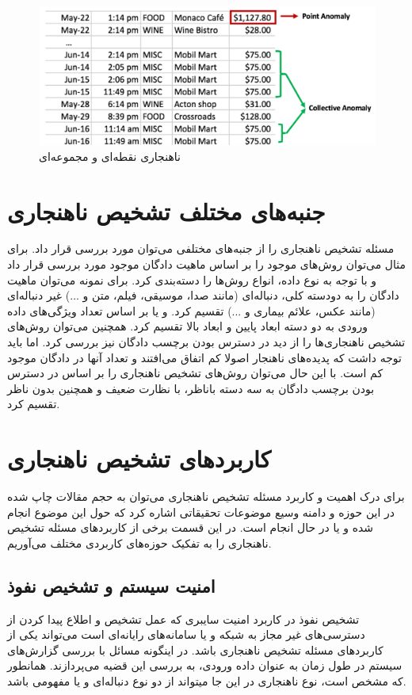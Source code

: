 \documentclass[12pt,a4paper]{report}
\begin{document}
\begin{figure}[!hp]
	\begin{center}
		\includegraphics[width=0.7\linewidth]{./images/figures/credit-card.png}

		\caption{
		ناهنجاری نقطه‌ای و مجموعه‌ای
		\cite{G.Chalapathy}
		}		
		\label{fig:anomaly-example-1}
		\centering
	\end{center}
\end{figure}

\section{جنبه‌های مختلف تشخیص ناهنجاری}
مسئله تشخیص ناهنجاری را از جنبه‌های مختلفی می‌توان مورد بررسی قرار داد. برای مثال می‌توان روش‌های موجود را بر اساس ماهیت دادگان موجود مورد بررسی قرار داد و با توجه به نوع داده، انواع روش‌ها را دسته‌بندی کرد. برای نمونه می‌توان ماهیت دادگان را به دودسته کلی، دنباله‌ای (مانند صدا، موسیقی، فیلم، متن و ...) غیر دنباله‌ای (مانند عکس، علائم بیماری و ...) تقسیم کرد. و یا بر اساس تعداد ویژگی‌های داده ورودی به دو دسته ابعاد پایین و ابعاد بالا تقسیم کرد. همچنین می‌توان روش‌های تشخیص ناهنجاری‌ها را از دید در دسترس بودن برچسب دادگان نیز بررسی کرد. اما باید توجه داشت که پدیده‌های ناهنجار اصولا کم اتفاق می‌افتند و تعداد آنها در دادگان موجود کم است. با این حال می‌توان روش‌های تشخیص ناهنجاری را بر اساس در دسترس بودن برچسب دادگان به سه دسته باناظر، با نظارت ضعیف و همچنین بدون ناظر تقسیم کرد.

\section {کاربرد‌های تشخیص ناهنجاری}
برای درک اهمیت و کاربرد مسئله تشخیص ناهنجاری می‌توان به حجم مقالات چاپ شده در این حوزه و دامنه وسیع موضوعات تحقیقاتی اشاره کرد که حول این موضوع انجام شده و یا در حال انجام است. در این قسمت برخی از کاربرد‌های مسئله تشخیص ناهنجاری را به تفکیک حوزه‌های کاربردی مختلف می‌آوریم.

\subsection{امنیت سیستم و تشخیص نفوذ}
تشخیص نفوذ در کاربرد امنیت سایبری که عمل تشخیص و اطلاع پیدا کردن از دسترسی‌های غیر مجاز به شبکه و یا سامانه‌های رایانه‌ای است می‌تواند یکی از کاربرد‌های مسئله تشخیص ناهنجاری باشد. در اینگونه مسائل با بررسی گزارش‌های سیستم در طول زمان به عنوان داده ورودی، به بررسی این قضیه می‌پردازند. همانطور که مشخص است، نوع  ناهنجاری در این جا میتواند از دو نوع دنباله‌ای و یا مفهومی باشد.
\end{document}
